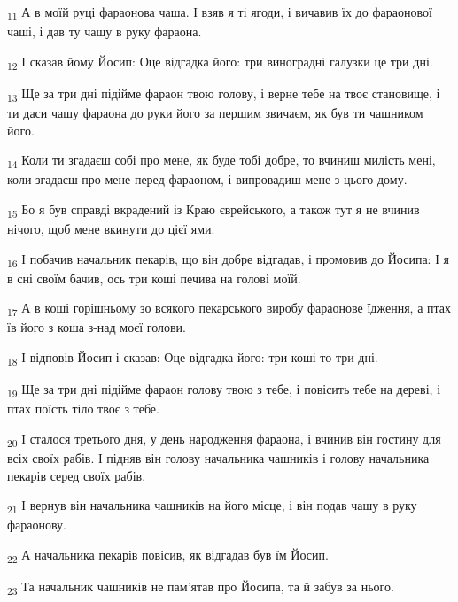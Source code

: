\begin{tcolorbox}
\textsubscript{11} А в моїй руці фараонова чаша. І взяв я ті ягоди, і вичавив їх до фараонової чаші, і дав ту чашу в руку фараона.
\end{tcolorbox}
\begin{tcolorbox}
\textsubscript{12} І сказав йому Йосип: Оце відгадка його: три виноградні галузки це три дні.
\end{tcolorbox}
\begin{tcolorbox}
\textsubscript{13} Ще за три дні підійме фараон твою голову, і верне тебе на твоє становище, і ти даси чашу фараона до руки його за першим звичаєм, як був ти чашником його.
\end{tcolorbox}
\begin{tcolorbox}
\textsubscript{14} Коли ти згадаєш собі про мене, як буде тобі добре, то вчиниш милість мені, коли згадаєш про мене перед фараоном, і випровадиш мене з цього дому.
\end{tcolorbox}
\begin{tcolorbox}
\textsubscript{15} Бо я був справді вкрадений із Краю єврейського, а також тут я не вчинив нічого, щоб мене вкинути до цієї ями.
\end{tcolorbox}
\begin{tcolorbox}
\textsubscript{16} І побачив начальник пекарів, що він добре відгадав, і промовив до Йосипа: І я в сні своїм бачив, ось три коші печива на голові моїй.
\end{tcolorbox}
\begin{tcolorbox}
\textsubscript{17} А в коші горішньому зо всякого пекарського виробу фараонове їдження, а птах їв його з коша з-над моєї голови.
\end{tcolorbox}
\begin{tcolorbox}
\textsubscript{18} І відповів Йосип і сказав: Оце відгадка його: три коші то три дні.
\end{tcolorbox}
\begin{tcolorbox}
\textsubscript{19} Ще за три дні підійме фараон голову твою з тебе, і повісить тебе на дереві, і птах поїсть тіло твоє з тебе.
\end{tcolorbox}
\begin{tcolorbox}
\textsubscript{20} І сталося третього дня, у день народження фараона, і вчинив він гостину для всіх своїх рабів. І підняв він голову начальника чашників і голову начальника пекарів серед своїх рабів.
\end{tcolorbox}
\begin{tcolorbox}
\textsubscript{21} І вернув він начальника чашників на його місце, і він подав чашу в руку фараонову.
\end{tcolorbox}
\begin{tcolorbox}
\textsubscript{22} А начальника пекарів повісив, як відгадав був їм Йосип.
\end{tcolorbox}
\begin{tcolorbox}
\textsubscript{23} Та начальник чашників не пам'ятав про Йосипа, та й забув за нього.
\end{tcolorbox}
